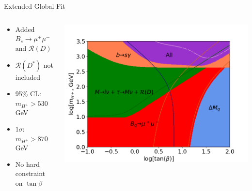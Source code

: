 \documentclass[10pt,xcolor={table,dvipsnames},t]{beamer}
\begin{document}
\begin{frame}{Extended Global Fit}
    \begin{columns}[T]
        \begin{column}{0.37\textwidth}
            \vspace{1.5em}
            \begin{itemize}
                \item Added $B_s\to\mu^+\mu^-$ and $\mathcal{R}(D)$
                \item $\mathcal{R}(D^*)$ not included
                \item 95\% CL: $m_{H^+}>530\,$GeV
                \item $1\sigma$: $m_{H^+}>870\,$GeV
                \item No hard constraint on $\tan\beta$
            \end{itemize}
        \end{column}
        \begin{column}{0.60\textwidth}
            \includegraphics[scale=0.35]{global_lines.png}
        \end{column}
    \end{columns}
\end{frame}
\end{document}
